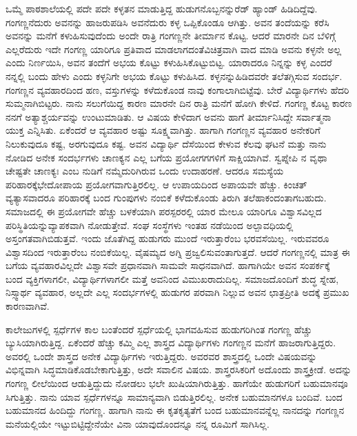 {ಒಮ್ಮೆ ಪಾಠಶಾಲೆಯಲ್ಲಿ   ಪದೇ ಪದೇ  ಕಳ್ಳತನ ಮಾಡುತ್ತಿದ್ದ ಹುಡುಗನೊಬ್ಬನನ್ನು\break  ರೆಡ್ ಹ್ಯಾಂಡ್ ಹಿಡಿದಿದ್ದೆವು. ಗಂಗಣ್ಣನೆದುರು ಅವನನ್ನು ಹಾಜರುಪಡಿಸಿ \hbox{ಅವನೆದುರು} ಕಳ್ಳ  ಒಪ್ಪಿಕೊಂಡೂ ಆಗಿತ್ತು. ಅವನ ತಂದೆಯನ್ನು ಕರೆಸಿ ಅವನನ್ನು ಮನೆಗೆ ಕಳುಹಿಸುವುದೆಂದು ಅಂದೇ ರಾತ್ರಿ  ಗಂಗಣ್ಣನೇ ತೀರ್ಮಾನ ಕೊಟ್ಟ.  ಆದರೆ ಮಾರನೇ ದಿನ ಬೆಳಿಗ್ಗೆ  ಎಲ್ಲರೆದುರು ಇದೇ ಗಂಗಣ್ಣ ಯಾರಿಗೂ ಪ್ರತಿವಾದ \hbox{ಮಾಡಲಾಗದಂತೆ}\break ವಿಚಿತ್ರವಾಗಿ ವಾದ ಮಾಡಿ  ಅವನು ಕಳ್ಳನೇ ಅಲ್ಲ ಎಂದು ನಿರ್ಣಯಿಸಿ, ಅವನ ತಂದೆಗೆ ಅಭಯ ಕೊಟ್ಟು ಕಳುಹಿಸಿಕೊಟ್ಟುಬಿಟ್ಟ. ಯಾರಾದರೂ ನಿನ್ನನ್ನು ಕಳ್ಳ ಎಂದರೆ ನನ್ನಲ್ಲಿ ಬಂದು ಹೇಳು ಎಂದು ಕಳ್ಳನಿಗೇ ಅಭಯ ಕೊಟ್ಟು ಕಳುಹಿಸಿದ. ಕಳ್ಳನನ್ನು\break ಹಿಡಿದವರೇ ತಲೆತಗ್ಗಿಸುವ ಸಂದರ್ಭ. ಗಂಗಣ್ಣನ ವ್ಯವಹಾರದಿಂದ ಹಣ, ವಸ್ತುಗಳನ್ನು ಕಳೆದುಕೊಂಡ ನಾವು ಕಂಗಾಲಾಗಿಬಿಟ್ಟೆವು. ಬೇರೆ ವಿದ್ಯಾರ್ಥಿಗಳು ಹೆದರಿ ಸುಮ್ಮನಾಗಿಬಿಟ್ಟರು. ನಾನು ಸಲುಗೆಯಿದ್ದ ಕಾರಣ ಮಾರನೇ ದಿನ ರಾತ್ರಿ ಮನೆಗೆ ಹೋಗಿ \hbox{ಕೇಳಿದೆ.} ಗಂಗಣ್ಣ ಕೊಟ್ಟ ಕಾರಣ ನನಗೆ ಅತ್ಯಾಶ್ಚರ್ಯವನ್ನು ಉಂಟುಮಾಡಿತು.  ಆ ವಿಷಯ  ಕೇಳಿದಾಗ ಅವನು ಹಾಗೆ ತೀರ್ಮಾನಿಸಿದ್ದೇ ಸರ್ವಾತ್ಮನಾ ಯುಕ್ತ ಎನ್ನಿಸಿತು. \hbox{ಏಕೆಂದರೆ} ಆ ವ್ಯವಹಾರ  ಅಷ್ಟು ಸೂಕ್ಷ್ಮವಾಗಿತ್ತು. ಹಾಗಾಗಿ ಗಂಗಣ್ಣನ ವ್ಯವಹಾರ ಅನೇಕರಿಗೆ ನಿಲುಕುವುದೂ ಕಷ್ಟ, ಅರಗುವುದೂ ಕಷ್ಟ. ಅವನ ವಿದ್ಯಾರ್ಥಿ ದೆಸೆಯಿಂದ ಕೇಳುವ ಕೆಲವು ಘಟನೆ ಮತ್ತು ನಾನು ನೋಡಿದ ಅನೇಕ ಸಂದರ್ಭಗಳು  ಚಾಣಕ್ಯನ ಎಲ್ಲ ಬಗೆಯ  ಪ್ರಯೋಗಗಗಳಿಗೆ  ಸಾಕ್ಷಿಯಾಗಿವೆ. ಸ್ವಪ್ನೇಪಿ ನ ವೃಥಾ ಚೇಷ್ಟತೇ ಚಾಣಕ್ಯಃ ಎಂಬ ನುಡಿಗೆ ನಮ್ಮೆದುರಿಗಿರುವ ಒಂದು ಉದಾಹರಣೆ. ಆದರೂ ಸಮಸ್ಯೆಯ ಪರಿಹಾರಕ್ಕೆ\break ಭೇದೋಪಾಯ ಪ್ರಯೋಗವಾಗುತ್ತಿರಲಿಲ್ಲ. ಆ ಉಪಾಯದಿಂದ   ಅಪಾಯವೇ ಹೆಚ್ಚು.  ಕಿಂಚತ್ ವ್ಯತ್ಯಾಸವಾದರೂ  ಪರಿಹಾರಕ್ಕೆ ಬಂದ ಗುಂಪುಗಳು  ನಂಬಿಕೆ ಕಳೆದುಕೊಂಡು ತಿರುಗಿ ತಲೆಹಾಕಂದಂತಾಗಬಹುದು.  ಸಮಾಜದಲ್ಲಿ ಈ ಪ್ರಯೋಗವೇ ಹೆಚ್ಚು ಬಳಕೆಯಾಗಿ ಪರಸ್ಪರರಲ್ಲಿ ಯಾರ ಮೇಲೂ ಯಾರಿಗೂ ವಿಶ್ವಾಸವಿಲ್ಲದ ಪರಿಸ್ಥಿತಿಯನ್ನು\break ವ್ಯಾಪಕವಾಗಿ ನೋಡುತ್ತೇವೆ. ಸಂಘ ಸಂಸ್ಥೆಗಳು ಇಂತಹ ನಡೆಯಿಂದ ಅಲ್ಪಾವಧಿಯಲ್ಲಿ ಅಸ್ತಂಗತವಾಗಿಬಿಡುತ್ತವೆ. ಇಂದು ಜೊತೆಗಿದ್ದ ಹುಡುಗರು ಮುಂದೆ ಇರುತ್ತಾರೆಂಬ ಭರವಸೆಯಿಲ್ಲ. ಇರುವವರೂ ವಿಶ್ವಾಸದಿಂದ ಇರುತ್ತಾರೆಂಬ ನಂಬಿಕೆಯಿಲ್ಲ. ವೈಷಮ್ಯದ ಅಗ್ನಿ ಪ್ರಜ್ವಲಿಸುವಂತಾಗುತ್ತದೆ. ಆದರೆ ಗಂಗಣ್ಣನಲ್ಲಿ  ಮಾತ್ರ ಈ ಬಗೆಯ ವ್ಯವಹಾರವಿಲ್ಲದೇ ವಿಶ್ವಾಸವೇ ಪ್ರಧಾನವಾಗಿ ಸಾಮವೇ ಸಾಧನವಾಗಿದೆ.  ಹಾಗಾಗಿಯೇ ಅವನ \hbox{ಸಂಪರ್ಕಕ್ಕೆ } ಬಂದ ವ್ಯಕ್ತಿಗಳಾಗಲೀ, ವಿದ್ಯಾರ್ಥಿಗಳಾಗಲೀ ಮತ್ತೆ ಅವನಿಂದ ವಿಮುಖರಾದುದಿಲ್ಲ. ಸಮಾಜದೊಂದಿಗೆ  ಶುದ್ಧ ಸ್ನೇಹ, ನಿಸ್ಸ್ವಾರ್ಥ ವ್ಯವಹಾರ, ಅಲ್ಲದೇ ಎಲ್ಲ ಸಂದರ್ಭಗಳಲ್ಲಿ ಹುಡುಗರ ಪರವಾಗಿ ನಿಲ್ಲುವ ಅವನ ಛಾತ್ರಪ್ರೀತಿ ಅದಕ್ಕೆ  ಪ್ರಮುಖ ಕಾರಣವಾಗಿವೆ. 

ಕಾಲೇಜುಗಳಲ್ಲಿ  ಸ್ಪರ್ಧೆಗಳ ಕಾಲ ಬಂತೆಂದರೆ ಸ್ಪರ್ಧೆಯಲ್ಲಿ ಭಾಗ\-ವಹಿಸುವ ಹುಡುಗರಿಗಿಂತ ಗಂಗಣ್ಣ ಹೆಚ್ಚು ಬ್ಯುಸಿಯಾಗಿರುತ್ತಿದ್ದ. ಏಕೆಂದರೆ ಹೆಚ್ಚು ಕಮ್ಮಿ ಎಲ್ಲ ಶಾಸ್ತ್ರದ ವಿದ್ಯಾರ್ಥಿಗಳು ಗಂಗಣ್ಣನ ಮನೆಗೆ ಹಾಜರಾಗುತ್ತಿದ್ದರು. ಅವರಲ್ಲಿ ಒಂದೇ ಶಾಸ್ತ್ರದ ಅನೇಕ ವಿದ್ಯಾರ್ಥಿಗಳು ಇರುತ್ತಿದ್ದರು. ಅವರವರ ಶಾಸ್ತ್ರದಲ್ಲಿ ಒಂದೇ ವಿಷಯವನ್ನು ವಿಭಿನ್ನವಾಗಿ ಸಿದ್ಧಮಾಡಿಕೊಡಬೇಕಾಗುತ್ತಿತ್ತು, ಅದೇ  ಸವಾಲಿನ ವಿಷಯ. \hbox{ಶಾಸ್ತ್ರರಸಿಕರಿಗೆ} ಅದೊಂದು ಶಾಸ್ತ್ರಕ್ರೀಡೆ. ಅದನ್ನು ಗಂಗಣ್ಣ ಲೀಲೆಯಿಂದ ಆಡುತ್ತಿದ್ದುದು ನೋಡಲು ಭಲೇ ಖುಷಿಯಾಗಿರುತ್ತಿತ್ತು. ಹಾಗೆಯೇ ಹುಡುಗರಿಗೆ ಬಹುಮಾನವೂ \hbox{ಸಿಗುತ್ತಿತ್ತು.} ನಾನು ಯಾವ ಸ್ಪರ್ಧೆಗಳನ್ನೂ ಸಾಮಾನ್ಯವಾಗಿ ಬಿಡುತ್ತಿರಲಿಲ್ಲ. ಅನೇಕ ಬಹುಮಾನಗಳೂ ಬಂದಿವೆ. ಬಂದ ಬಹುಮಾನದ ಹಿಂದಿದ್ದು ಗಂಗಣ್ಣ. ಹಾಗಾಗಿ ನಾನು ಈ ಕೃತಕೃತ್ಯತೆಗೆ ಬಂದ ಬಹುಮಾನವನ್ನೆಲ್ಲ ನಾನದನ್ನು ಗಂಗಣ್ಣನ ಮನೆಯಲ್ಲಿಯೇ ಇಟ್ಟುಬಿಟ್ಟಿದ್ದೇನೆಯೇ ವಿನಾ ಯಾವುದೊಂದನ್ನೂ ನನ್ನ ರೂಮಿಗೆ ಸಾಗಿಸಿಲ್ಲ. 

}

